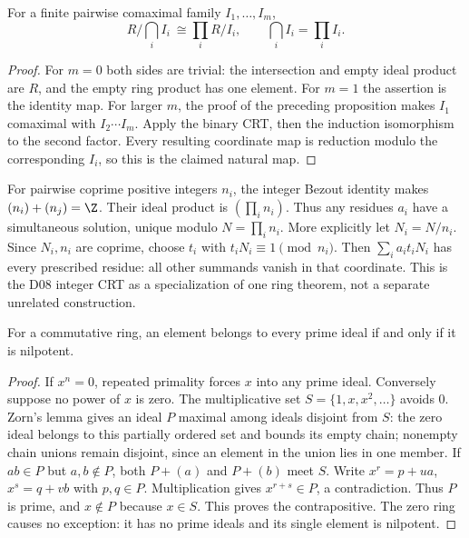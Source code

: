 \begin{theorem}\label{thm:crt-finite}
For a finite pairwise comaximal family $I_1,\ldots,I_m$,
\[
 R/\bigcap_i I_i\ \cong\prod_i R/I_i,\qquad
 \bigcap_iI_i=\prod_i I_i.
\]
\end{theorem}
\begin{proof}
For $m=0$ both sides are trivial: the intersection and empty ideal
product are $R$, and the empty ring product has one element.
For $m=1$ the assertion is the identity map. For larger $m$, the proof
of the preceding proposition makes $I_1$ comaximal with
$I_2\cdots I_m$. Apply the binary CRT, then the induction isomorphism
to the second factor. Every resulting coordinate map is reduction
modulo the corresponding $I_i$, so this is the claimed natural map.
\end{proof}
For pairwise coprime positive integers $n_i$, the integer Bezout identity
makes $(n_i)+(n_j)=\Z$. Their ideal product is $(\prod_i n_i)$.
Thus any residues $a_i$ have a simultaneous solution, unique modulo
$N=\prod_i n_i$. More explicitly let $N_i=N/n_i$.
Since $N_i,n_i$ are coprime, choose $t_i$ with
$t_iN_i\equiv1\pmod{n_i}$. Then
$\sum_i a_it_iN_i$ has every prescribed residue: all other summands
vanish in that coordinate. This is the D08 integer CRT as a specialization
of one ring theorem, not a separate unrelated construction.

\begin{lemma}\label{lem:nilpotent-prime-separation}
For a commutative ring, an element belongs to every prime ideal if
and only if it is nilpotent.
\end{lemma}
\begin{proof}
If $x^n=0$, repeated primality forces $x$ into any prime ideal.
Conversely suppose no power of $x$ is zero. The multiplicative set
$S=\{1,x,x^2,\ldots\}$ avoids $0$. Zorn's lemma gives an ideal $P$
maximal among ideals disjoint from $S$: the zero ideal belongs to this
partially ordered set and bounds its empty chain; nonempty chain unions remain disjoint,
since an element in the union lies in one member.
If $ab\in P$ but $a,b\notin P$, both $P+(a)$ and $P+(b)$ meet $S$.
Write $x^r=p+ua$, $x^s=q+vb$ with $p,q\in P$.
Multiplication gives $x^{r+s}\in P$, a contradiction. Thus $P$ is
prime, and $x\notin P$ because $x\in S$. This proves the contrapositive.
The zero ring causes no exception: it has no prime ideals and its
single element is nilpotent.
\end{proof}
